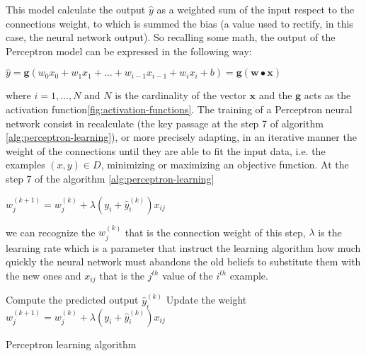 This model calculate the output $\hat{y}$ as a weighted sum of the input respect to the connections weight, to which is summed the bias (a value used to rectify, in this case, the neural network output). So recalling some math, the output of the Perceptron model can be expressed in the following way:
\begin{center}
	$\hat{y} = \textbf{g}(w_{0}x_{0} + w_{1}x_{1} + \dots + w_{i-1}x_{i-1}  + w_{i}x_{i} + b  ) = \textbf{g}(\textbf{w} \bullet \textbf{x})$
\end{center}
where $i = 1, \dots, N$ and $N$ is the cardinality of the vector $\textbf{x}$ and the $\textbf{g}$ acts as the activation function\ref{fig:activation-functions}.
The training of a Perceptron neural network consist in recalculate (the key passage at the step 7 of algorithm \ref{alg:perceptron-learning}), or more precisely adapting, in an iterative manner the weight of the connections until they are able to fit the input data, i.e. the examples $(x, y) \in D$, minimizing or maximizing an objective function.
At the step 7 of the algorithm \ref{alg:perceptron-learning}
\begin{center}
	$w_{j}^{(k + 1)} = w_{j}^{(k)} + \lambda(y_{i} + \hat{y}_{i}^{(k)})x_{ij}$	
\end{center}
we can recognize the $w_{j}^{(k)}$ that is the connection weight of this step, $\lambda$ is the learning rate which is a parameter that instruct the learning algorithm how much quickly the neural network must abandons the old beliefs to substitute them with the new ones and $x_{ij}$ that is the $j^{th}$ value of the $i^{th}$ example.

\begin{algorithm}
	\begin{algorithmic}[1]
		\Repeat
				\State Compute the predicted output $\hat{y}_{i}^{(k)}$
					\State Update the weight $w_{j}^{(k + 1)} = w_{j}^{(k)} + \lambda(y_{i} + \hat{y}_{i}^{(k)})x_{ij}$
				\EndFor
			\EndFor
	\end{algorithmic}
	\caption{Perceptron learning algorithm\cite{ITDM:2014}}\label{alg:perceptron-learning}
\end{algorithm}

